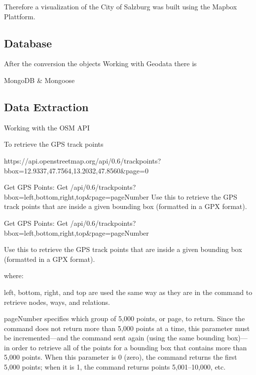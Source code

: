 Therefore a visualization of the City of Salzburg was built using the Mapbox Plattform. 




\subsection{Database}

After the conversion the objects 
Working with Geodata there is 

MongoDB & Mongoose

\subsection{Data Extraction}

Working with the OSM API

To retrieve the GPS track points 

https://api.openstreetmap.org/api/0.6/trackpoints?bbox=12.9337,47.7564,13.2032,47.8560&page=0

Get GPS Points: Get /api/0.6/trackpoints?bbox=left,bottom,right,top&page=pageNumber
Use this to retrieve the GPS track points that are inside a given bounding box (formatted in a GPX format).

Get GPS Points: Get /api/0.6/trackpoints?bbox=left,bottom,right,top&page=pageNumber


Use this to retrieve the GPS track points that are inside a given bounding box (formatted in a GPX format).

where:

left, bottom, right, and top are used the same way as they are in the command to retrieve nodes, ways, and relations.

pageNumber specifies which group of 5,000 points, or page, to return. Since the command does not return more than 5,000 points at a time, this parameter must be incremented—and the command sent again (using the same bounding box)—in order to retrieve all of the points for a bounding box that contains more than 5,000 points. When this parameter is 0 (zero), the command returns the first 5,000 points; when it is 1, the command returns points 5,001–10,000, etc.


